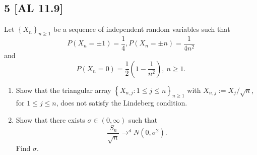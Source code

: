 \documentclass[12pt]{article}
\begin{document}
\subsection*{5 [AL 11.9]}
\begin{tcolorbox}
  Let $\left\{ X_n \right\}_{n\geq 1}$ be a sequence of independent random variables such that 
  \[ P(X_{n} = \pm 1) = \frac{1}{4}, P(X_{n} = \pm n) = \frac{1}{4n^{2}} \]
  and 
  \[ P(X_{n} = 0) = \frac{1}{2}\left( 1 - \frac{1}{n^{2}} \right), \ n \geq 1. \]
  \begin{enumerate}[label = (\alph*)]
    \item Show that the triangular array $\left\{ X_{n,j} : 1 \leq j \leq n \right\}_{n\geq 1}$ with $X_{n,j} := X_{j}/\sqrt{n}$, for $1 \leq j \leq
      n$, does not satisfy the Lindeberg condition.
    \item Show that there exists $\sigma \in (0,\infty)$ such that 
      \[ \frac{S_n}{\sqrt{n}} \rightarrow^{d}N(0,\sigma^{2}). \]
      Find $\sigma$.
  \end{enumerate}
\end{tcolorbox}
\end{document}
